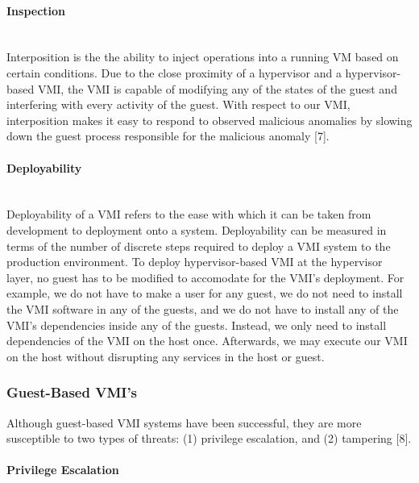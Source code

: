 \documentclass{report}
\begin{document}
\begin{spacing}{1.5}
\paragraph{Inspection}\mbox{}\\

{\large
Interposition is the the ability to inject operations into a running VM based on certain conditions. Due to the close proximity of a hypervisor and a hypervisor-based VMI, the VMI is capable of modifying any of the states of the guest and interfering with every activity of the guest. With respect to our VMI, interposition makes it easy to respond to observed malicious anomalies by slowing down the guest process responsible for the malicious anomaly [7].
\newline
}


\paragraph{Deployability}\mbox{}\\

{\large
Deployability of a VMI refers to the ease with which it can be taken from development to deployment onto a system. Deployability can be measured in terms of the number of discrete steps required to deploy a VMI system to the production environment. To deploy hypervisor-based VMI at the hypervisor layer, no guest has to be modified to accomodate for the VMI's deployment. For example, we do not have to make a user for any guest, we do not need to install the VMI software in any of the guests, and we do not have to install any of the VMI's dependencies inside any of the guests. Instead, we only need to install dependencies of the VMI on the host once. Afterwards, we may execute our VMI on the host without disrupting any services in the host or guest.
\newline
}


\subsubsection{Guest-Based VMI's}

{\large
Although guest-based VMI systems have been successful, they are more susceptible to two types of threats: (1) privilege escalation, and (2) tampering [8]. 
\newline
}

\paragraph{Privilege Escalation}\mbox{}\\


\end{spacing}
\end{document}
